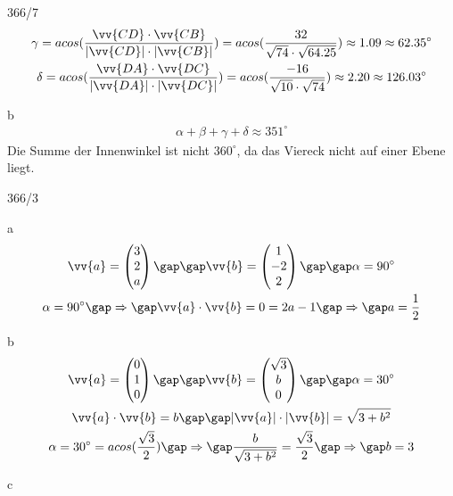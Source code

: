 \begin{exercise}{366/7}
\begin{gather*}
    \gamma = acos(\frac{\vv{CD} \cdot \vv{CB}}{|\vv{CD}| \cdot |\vv{CB}|}) = acos(\frac{32}{\sqrt{74} \cdot \sqrt{64.25}}) \approx 1.09 \approx 62.35^\circ \\
    \delta = acos(\frac{\vv{DA} \cdot \vv{DC}}{|\vv{DA}| \cdot |\vv{DC}|}) = acos(\frac{-16}{\sqrt{10} \cdot \sqrt{74}}) \approx 2.20 \approx 126.03^\circ
  \end{gather*}
  \item [b]
  \begin{gather*}
    \alpha + \beta + \gamma + \delta \approx 351^\circ
  \end{gather*}
  Die Summe der Innenwinkel ist nicht $360^\circ$, da das Viereck nicht auf einer Ebene liegt.
\end{exercise}
\begin{exercise}{366/3}
  \item [a]
  \begin{gather*}
    \vv{a} = \begin{pmatrix}3 \\ 2 \\ a\end{pmatrix} \gap\gap \vv{b} = \begin{pmatrix}1 \\ -2 \\ 2\end{pmatrix} \gap\gap \alpha = 90^\circ \\
    \alpha = 90^\circ \gap\Rightarrow\gap \vv{a} \cdot \vv{b} = 0 = 2a - 1 \gap\Rightarrow\gap a = \frac{1}{2}
  \end{gather*}
  \item [b]
  \begin{gather*}
    \vv{a} = \begin{pmatrix}0 \\ 1 \\ 0\end{pmatrix} \gap\gap \vv{b} = \begin{pmatrix}\sqrt{3} \\ b \\ 0\end{pmatrix} \gap\gap \alpha = 30^\circ \\
    \vv{a} \cdot \vv{b} = b \gap\gap |\vv{a}| \cdot |\vv{b}| = \sqrt{3 + b^2} \\
    \alpha = 30^\circ = acos(\frac{\sqrt{3}}{2}) \gap\Rightarrow\gap \frac{b}{\sqrt{3 + b^2}} = \frac{\sqrt{3}}{2} \gap\Rightarrow\gap b = 3
  \end{gather*}
  \item [c]

\end{exercise}
